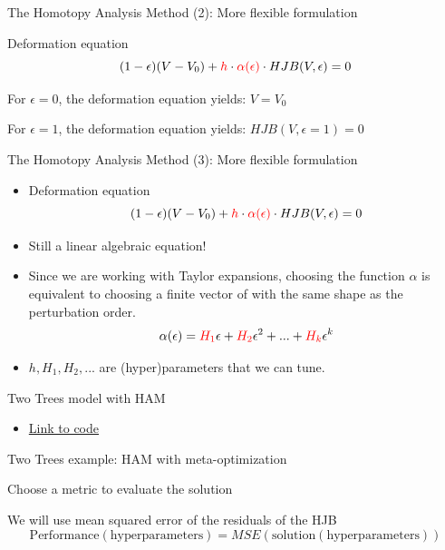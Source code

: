 \documentclass[12pt,aspectratio=169]{beamer}
\newenvironment{wideitemize}{\itemize\addtolength{\itemsep}{10pt}}{\enditemize}
\newcommand{\vspM}{\vspace{0.12truecm}}
\begin{document}
  
  \begin{frame}{The Homotopy Analysis Method (2): More flexible formulation}
    \begin{wideitemize}
      \item Deformation equation
        $$
          (1 - \epsilon) (V - V_0) + {\color{red}h} \cdot {\color{red}\alpha(\epsilon)} \cdot HJB(V, \epsilon) = 0
        $$
      
      \item For $\epsilon=0$, the deformation equation yields: $V = V_0$
      \item For $\epsilon=1$, the deformation equation yields: $HJB(V, \epsilon=1)=0$
    \end{wideitemize}
  \end{frame}

  \begin{frame}{The Homotopy Analysis Method (3): More flexible formulation}
    \begin{itemize}
      \item Deformation equation
        $$
          (1 - \epsilon) (V - V_0) + {\color{red}h} \cdot {\color{red}\alpha(\epsilon)} \cdot HJB(V, \epsilon) = 0
        $$

      \item Still a linear algebraic equation!\vspM
      \item Since we are working with Taylor expansions, choosing the function $\alpha$ is equivalent to choosing a finite vector of with the same shape as the perturbation order.
      \[\alpha(\epsilon) = {\color{red}H_1} \epsilon + {\color{red}H_2} \epsilon^2 + ... + {\color{red}H_k} \epsilon^k\]
      \item $h, H_1, H_2, ...$ are (hyper)parameters that we can tune.

      \end{itemize}
  \end{frame}

  \begin{frame}{Two Trees model with HAM}
    \begin{itemize}
      \item \href{https://colab.research.google.com/drive/1d5e1BKs\_lN4q6ZE0TxlFdxdvJxAwYPQj}{\color{blue} Link to code}

    \end{itemize}      
  \end{frame}

    \begin{frame}{Two Trees example: HAM with meta-optimization}
    \begin{wideitemize}
      \item Choose a metric to evaluate the solution
      \item We will use mean squared error of the residuals of the HJB
      $$ \text{Performance}(\text{hyperparameters}) = MSE\left(\text{solution}\left(\text{hyperparameters}\right)\right) $$
    \end{wideitemize}      
  \end{frame}
\end{document}
